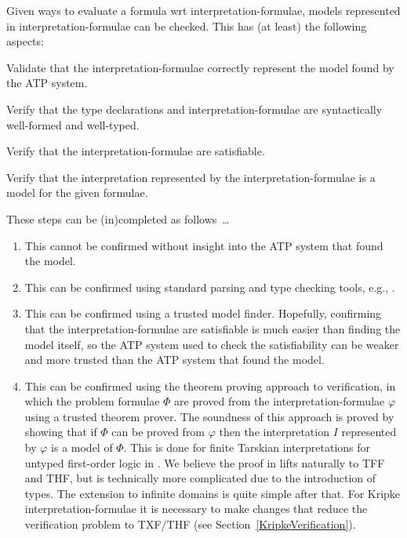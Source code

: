 \documentclass{easychair}
\newenvironment{packed_enumerate}{
\vspace*{-0.3em}
\begin{enumerate}
\setlength{\partopsep}{0pt}
\setlength{\itemsep}{1pt}
\setlength{\parskip}{0pt}
\setlength{\parsep}{0pt}
}{\end{enumerate}}
\begin{document}
Given ways to evaluate a formula wrt interpretation-formulae, models represented in
interpretation-formulae can be checked.
This has (at least) the following aspects: 
\begin{packed_enumerate}
\item Validate that the interpretation-formulae correctly represent the model found 
      by the ATP system.
\item Verify that the type declarations and interpretation-formulae are syntactically well-formed 
      and well-typed. 
\item Verify that the interpretation-formulae are satisfiable.
\item Verify that the interpretation represented by the interpretation-formulae is a model for 
      the given formulae.
\end{packed_enumerate}

These steps can be (in)completed as follows~\ldots
\begin{enumerate}
\item This cannot be confirmed without insight into the ATP system that found the model.
\item This can be confirmed using standard parsing and type checking tools, e.g., 
      \cite{VS06,HR15,Ste23}.
\item This can be confirmed using a trusted model finder.
      Hopefully, confirming that the interpretation-formulae are satisfiable is much easier than 
      finding the model itself, so the ATP system used to check the satisfiability can be weaker 
      and more trusted than the ATP system that found the model.
\item This can be confirmed using the theorem proving approach to verification, in which the 
      problem formulae $\Phi$ are proved from the interpretation-formulae $\varphi$ using a trusted 
      theorem prover.
      The soundness of this approach is proved by showing that if $\Phi$ can be proved from 
      $\varphi$ then the interpretation $I$ represented by $\varphi$ is a model of $\Phi$.
      This is done for finite Tarskian interpretations for untyped first-order logic in 
      \cite{SS+23-LPAR}.
      We believe the proof in \cite{SS+23-LPAR} lifts naturally to TFF and THF, but is technically 
      more complicated due to the introduction of types.
      The extension to infinite domains is quite simple after that.
      For Kripke interpretation-formulae it is necessary to make changes that reduce the
      verification problem to TXF/THF (see Section~\ref{KripkeVerification}).
\end{enumerate}
\end{document}
